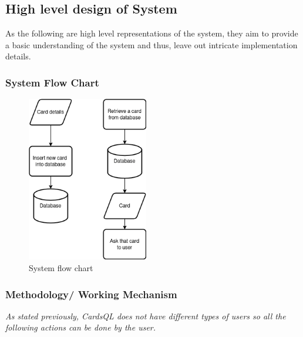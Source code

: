\documentclass[a4paper]{article}
\begin{document}
\subsection{High level design of System}
\label{sec:org5f69f2b}
As the following are high level representations of the system, they aim to provide a basic understanding of the system and thus, leave out intricate implementation details.

\subsubsection{System Flow Chart}
\label{sec:org5b3d271}

\begin{figure}[htbp]
\centering
\includegraphics[width=200px]{diagrams/system-flow-chart.png}
\caption{System flow chart}
\end{figure}
\FloatBarrier 

\subsubsection{Methodology/ Working Mechanism}
\label{sec:orgd234090}
\emph{As stated previously, CardsQL does not have different types of users so all the following actions can be done by the user.}
\end{document}
